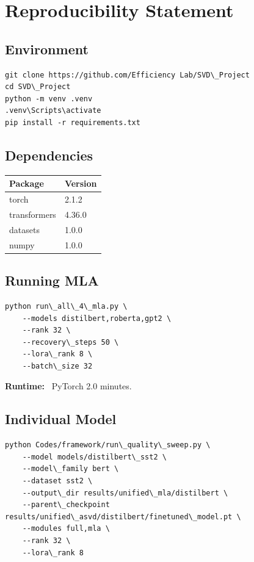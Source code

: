 
\section{Reproducibility Statement}

\subsection{Environment}

\begin{lstlisting}
git clone https://github.com/Efficiency Lab/SVD\_Project
cd SVD\_Project
python -m venv .venv
.venv\Scripts\activate
pip install -r requirements.txt
\end{lstlisting}

\subsection{Dependencies}

\begin{table}[H]
\centering
\small
\begin{tabular}{ll}
\toprule
\textbf{Package} & \textbf{Version} \\
\midrule
torch & 2.1.2 \\
transformers & 4.36.0 \\
datasets & 1.0.0 \\
numpy & 1.0.0 \\
\bottomrule
\end{tabular}
\end{table}

\subsection{Running MLA}

\begin{lstlisting}
python run\_all\_4\_mla.py \
    --models distilbert,roberta,gpt2 \
    --rank 32 \
    --recovery\_steps 50 \
    --lora\_rank 8 \
    --batch\_size 32
\end{lstlisting}

\textbf{Runtime:} ~PyTorch 2.0 minutes.

\subsection{Individual Model}

\begin{lstlisting}
python Codes/framework/run\_quality\_sweep.py \
    --model models/distilbert\_sst2 \
    --model\_family bert \
    --dataset sst2 \
    --output\_dir results/unified\_mla/distilbert \
    --parent\_checkpoint results/unified\_asvd/distilbert/finetuned\_model.pt \
    --modules full,mla \
    --rank 32 \
    --lora\_rank 8
\end{lstlisting}

